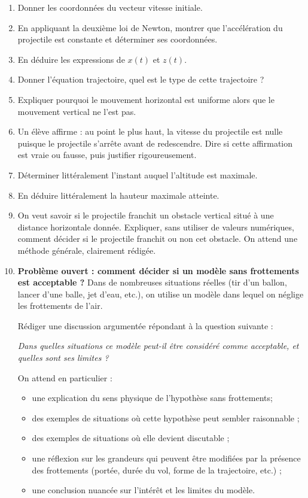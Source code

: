 \documentclass[11pt,a4paper]{article}
\begin{document}
\begin{enumerate}[label=\textbf{\arabic*.}]
    \item Donner les coordonnées du vecteur vitesse initiale.
    \item En appliquant la deuxième loi de Newton, montrer que l’accélération du projectile est constante et déterminer ses coordonnées.
    \item En déduire les expressions de \(x(t)\) et \(z(t)\).
    \item Donner l'équation trajectoire, quel est le type de cette trajectoire ?
    \item Expliquer pourquoi le mouvement horizontal est uniforme alors que le mouvement vertical ne l’est pas.
    \item Un élève affirme : \og au point le plus haut, la vitesse du projectile est nulle puisque le projectile s’arrête avant de redescendre\fg.  
    Dire si cette affirmation est vraie ou fausse, puis justifier rigoureusement.
    \item Déterminer littéralement l’instant auquel l’altitude est maximale.
    \item En déduire littéralement la hauteur maximale atteinte.
    \item \textbf{}  
    On veut savoir si le projectile franchit un obstacle vertical situé à une distance horizontale donnée.  
    Expliquer, sans utiliser de valeurs numériques, comment décider si le projectile franchit ou non cet obstacle.  
    On attend une méthode générale, clairement rédigée.
    \item \textbf{Problème ouvert : comment décider si un modèle sans frottements est acceptable ?}  
    Dans de nombreuses situations réelles (tir d’un ballon, lancer d’une balle, jet d’eau, etc.), on utilise un modèle dans lequel on néglige les frottements de l’air.

    Rédiger une discussion argumentée répondant à la question suivante :
    \begin{center}
        \textit{Dans quelles situations ce modèle peut-il être considéré comme acceptable, et quelles sont ses limites ?}
    \end{center}

    On attend en particulier :
    \begin{itemize}
        \item une explication du sens physique de l’hypothèse \og sans frottements\fg ;
        \item des exemples de situations où cette hypothèse peut sembler raisonnable ;
        \item des exemples de situations où elle devient discutable ;
        \item une réflexion sur les grandeurs qui peuvent être modifiées par la présence des frottements (portée, durée du vol, forme de la trajectoire, etc.) ;
        \item une conclusion nuancée sur l’intérêt et les limites du modèle.
    \end{itemize}
\end{enumerate}
\end{document}
